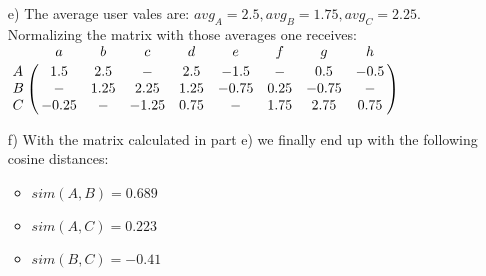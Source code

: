\documentclass[11pt,a4paper]{scrartcl}
\begin{document}
\begin{itemize}
	\item[e)] The average user vales are: $avg_A = 2.5, avg_B = 1.75, avg_C = 2.25$. Normalizing the matrix with those averages one receives:
$\bordermatrix{
  & a	& b   & c & d & e & f & g & h  \cr
A & 1.5 & 2.5 & - & 2.5 & -1.5 & - & 0.5 & -0.5 \cr
B & - & 1.25 & 2.25 & 1.25 & -0.75 & 0.25 & -0.75 & - \cr
C & -0.25 & - & -1.25 & 0.75 & - & 1.75 & 2.75 & 0.75 \cr
}
$ 
	\item[f)] With the matrix calculated in part e) we finally end up with the following cosine distances:
	\begin{itemize}
		\item $sim(A,B) = 0.689 $
		\item $sim(A,C) = 0.223$
		\item $sim(B,C) = -0.41 $
	\end{itemize}
	\end{itemize}
\end{document}
